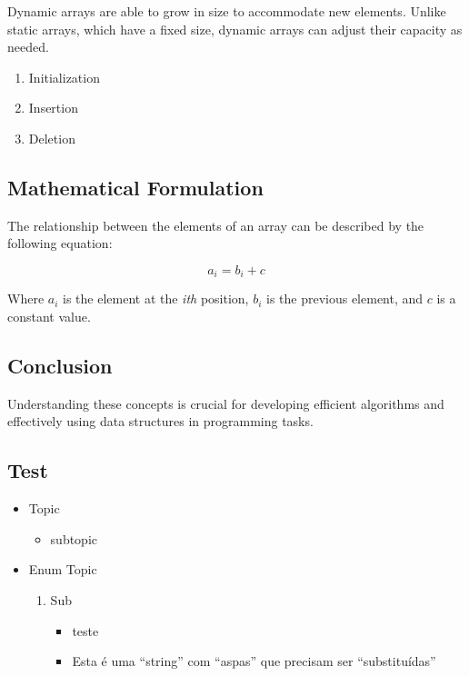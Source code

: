 Dynamic arrays are able to grow in size to accommodate new elements. Unlike static arrays, which have a fixed size, dynamic arrays can adjust their capacity as needed.

\begin{enumerate}
	\item Initialization
	\item Insertion
	\item Deletion
\end{enumerate}

\subsection*{Mathematical Formulation}

The relationship between the elements of an array can be described by the following equation:

\[
a_i = b_i + c
\]

Where $a_i$ is the element at the \textit{ith} position, $b_i$ is the previous element, and $c$ is a constant value.

\subsection*{Conclusion}

Understanding these concepts is crucial for developing efficient algorithms and effectively using data structures in programming tasks.

\hrulefill

\subsection*{Test}

\begin{itemize}
	\item Topic
	\begin{itemize}
		\item subtopic
	\end{itemize}
	\item Enum Topic
	\begin{enumerate}
		\item Sub
		\begin{itemize}
			\item teste
			\item Esta é uma ``string'' com ``aspas'' que precisam ser ``substituídas''
		\end{itemize}

	\end{enumerate}

\end{itemize}

